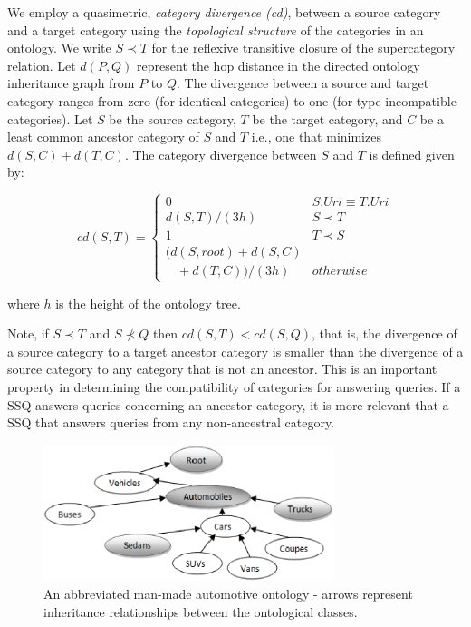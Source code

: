 
We employ a quasimetric, \textit{category
divergence (cd)},
between a source category and a target category using the \textit{topological
structure} of the categories in an ontology. We write $S \prec T$ for the
reflexive
transitive closure of the supercategory relation. Let $d(P,Q)$ represent the hop
distance in the directed ontology inheritance graph from $P$ to $Q$. The
divergence between a source and target category ranges from zero (for identical
categories) to one (for type incompatible categories). Let $S$ be the source
category, $T$ be
the target category, and $C$ be a least common ancestor category of $S$ and
$T$ i.e., one that minimizes $d(S,C) + d(T,C)$. The category divergence between $S$ and $T$ is defined given by:

\begin{equation}
cd(S, T) = \begin{cases}
0 & S.{Uri} \equiv T.{Uri}\\
d(S, T)/(3h) & S \prec T\\
1 & T \prec S\\
(d(S,root) + d(S,C) \\ \ \ \ \ + d(T,C))/(3h) & otherwise
\end{cases}
\end{equation}

\noindent where $h$ is the height of the ontology tree.

Note, if $S \prec T$ and $S \not\prec Q$ then $cd(S,T) <
cd(S,Q)$, that is, the divergence of a source category to a target
ancestor category is smaller than the divergence of a source category to any
category that is not an ancestor. This is an important property in
determining the compatibility of categories for answering queries.  If a
SSQ answers queries concerning an ancestor category, it is more relevant
that a SSQ that answers queries from any non-ancestral category.

\begin{figure}[t]
\centering
\includegraphics[width=85mm]{img/automotive_ontology.eps}
\caption{An abbreviated man-made automotive ontology - arrows represent inheritance relationships between the ontological classes.}
\label{fig:automotive_ontology}
\end{figure}


